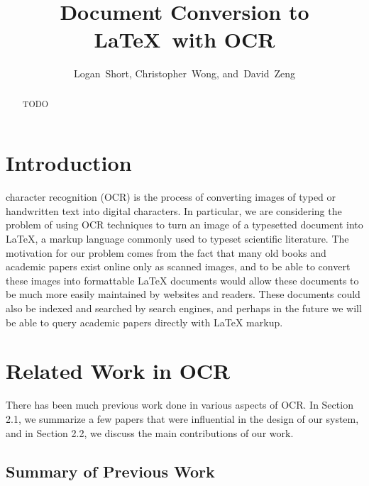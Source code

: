 \documentclass[12pt]{IEEEtran}
\newcommand{\latex}{\LaTeX\xspace}
\begin{document}
\title{Document Conversion to \latex\ with OCR}
\author{Logan~Short, Christopher~Wong, and~David~Zeng}%
\maketitle

\begin{abstract}
TODO
\end{abstract}

\section{Introduction}

 character recognition (OCR) is the process of converting images of typed or handwritten text into digital characters. In particular, we are considering the problem of using OCR techniques to turn an image of a typesetted document into \latex, a markup language commonly used to typeset scientific literature. The motivation for our problem comes from the fact that many old books and academic papers exist online only as scanned images, and to be able to convert these images into formattable \latex documents would allow these documents to be much more easily maintained by websites and readers. These documents could also be indexed and searched by search engines, and perhaps in the future we will be able to query academic papers directly with \latex markup.

\section{Related Work in OCR}

There has been much previous work done in various aspects of OCR. In Section 2.1, we summarize a few papers that were influential in the design of our system, and in Section 2.2, we discuss the main contributions of our work.

\subsection{Summary of Previous Work}
\end{document}
